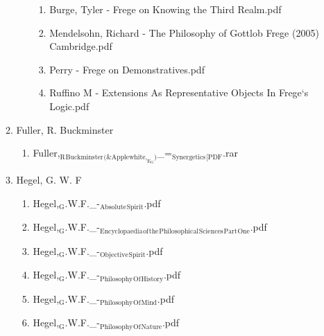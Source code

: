 \documentclass[11pt]{article}
\begin{document}
\begin{enumerate}
\begin{enumerate}
\begin{enumerate}
\begin{enumerate}
\item Burge, Tyler - Frege on Knowing the Third Realm.pdf
\label{sec-1-1-1-1-34-25-34-4-2}

\item Mendelsohn, Richard - The Philosophy of Gottlob Frege (2005) Cambridge.pdf
\label{sec-1-1-1-1-34-25-34-4-3}

\item Perry - Frege on Demonstratives.pdf
\label{sec-1-1-1-1-34-25-34-4-4}

\item Ruffino M - Extensions As Representative Objects In Frege‘s Logic.pdf
\label{sec-1-1-1-1-34-25-34-4-5}
\end{enumerate}
\end{enumerate}

\item Fuller, R. Buckminster
\label{sec-1-1-1-1-34-25-35}
\begin{enumerate}
\item Fuller,$_{\text{R}}$$_{\text{Buckminster}}$$_{\text{(\& Applewhite,}_{\text{E}}_{\text{G}}\text{)}}$\_=$_{\text{Synergetics}}$$_{\text{[PDF}}$.rar
\label{sec-1-1-1-1-34-25-35-1}
\end{enumerate}

\item Hegel, G. W. F
\label{sec-1-1-1-1-34-25-36}
\begin{enumerate}
\item Hegel,$_{\text{G}}$.W.F.\_-$_{\text{Absolute}}$$_{\text{Spirit}}$.pdf
\label{sec-1-1-1-1-34-25-36-1}

\item Hegel,$_{\text{G}}$.W.F.\_-$_{\text{Encyclopaedia}}$$_{\text{of}}$$_{\text{the}}$$_{\text{Philosophical}}$$_{\text{Sciences}}$$_{\text{Part}}$$_{\text{One}}$.pdf
\label{sec-1-1-1-1-34-25-36-2}

\item Hegel,$_{\text{G}}$.W.F.\_-$_{\text{Objective}}$$_{\text{Spirit}}$.pdf
\label{sec-1-1-1-1-34-25-36-3}

\item Hegel,$_{\text{G}}$.W.F.\_-$_{\text{Philosophy}}$$_{\text{Of}}$$_{\text{History}}$.pdf
\label{sec-1-1-1-1-34-25-36-4}

\item Hegel,$_{\text{G}}$.W.F.\_-$_{\text{Philosophy}}$$_{\text{Of}}$$_{\text{Mind}}$.pdf
\label{sec-1-1-1-1-34-25-36-5}

\item Hegel,$_{\text{G}}$.W.F.\_-$_{\text{Philosophy}}$$_{\text{Of}}$$_{\text{Nature}}$.pdf
\label{sec-1-1-1-1-34-25-36-6}


\end{enumerate}
\end{enumerate}
\end{enumerate}
\end{document}

